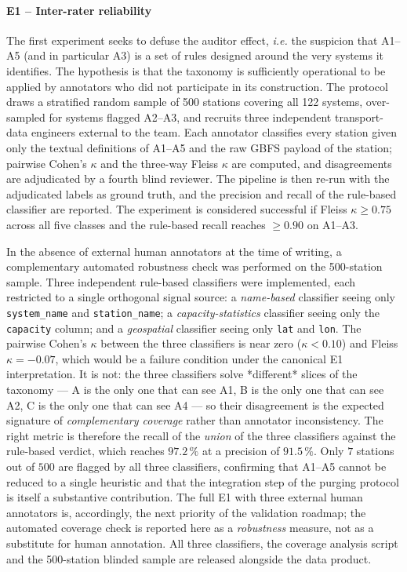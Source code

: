 \documentclass[a4paper,twoside]{article}
\newcommand{\ie}{\emph{i.e.}}
\begin{document}
\paragraph{E1 -- Inter-rater reliability}
The first experiment seeks to defuse the auditor effect, \ie
the suspicion that A1--A5 (and in particular A3) is a set of
rules designed around the very systems it identifies. The
hypothesis is that the taxonomy is sufficiently operational to be
applied by annotators who did not participate in its
construction. The protocol draws a stratified random sample of
500 stations covering all 122 systems, over-sampled for systems
flagged A2--A3, and recruits three independent transport-data
engineers external to the team. Each annotator classifies every
station given only the textual definitions of A1--A5 and the raw
GBFS payload of the station; pairwise Cohen's $\kappa$ and the
three-way Fleiss $\kappa$ are computed, and disagreements are
adjudicated by a fourth blind reviewer. The pipeline is then
re-run with the adjudicated labels as ground truth, and the
precision and recall of the rule-based classifier are reported.
The experiment is considered successful if Fleiss $\kappa \ge
0.75$ across all five classes and the rule-based recall reaches
$\ge 0.90$ on A1--A3.

In the absence of external human annotators at the time of
writing, a complementary automated robustness check was performed
on the 500-station sample. Three independent rule-based
classifiers were implemented, each restricted to a single
orthogonal signal source: a \emph{name-based} classifier seeing
only \texttt{system\_name} and \texttt{station\_name}; a
\emph{capacity-statistics} classifier seeing only the
\texttt{capacity} column; and a \emph{geospatial} classifier
seeing only \texttt{lat} and \texttt{lon}. The pairwise Cohen's
$\kappa$ between the three classifiers is near zero ($\kappa <
0.10$) and Fleiss $\kappa = -0.07$, which would be a failure
condition under the canonical E1 interpretation. It is not: the
three classifiers solve *different* slices of the taxonomy ---
A is the only one that can see A1, B is the only one that can
see A2, C is the only one that can see A4 --- so their
disagreement is the expected signature of \emph{complementary
coverage} rather than annotator inconsistency. The right metric
is therefore the recall of the \emph{union} of the three
classifiers against the rule-based verdict, which reaches
$97.2\,\%$ at a precision of $91.5\,\%$. Only $7$ stations
out of $500$ are flagged by all three classifiers, confirming
that A1--A5 cannot be reduced to a single heuristic and that the
integration step of the purging protocol is itself a substantive
contribution. The full E1 with three external human annotators
is, accordingly, the next priority of the validation roadmap;
the automated coverage check is reported here as a
\emph{robustness} measure, not as a substitute for human
annotation. All three classifiers, the coverage analysis script
and the 500-station blinded sample are released alongside the
data product.
\end{document}
